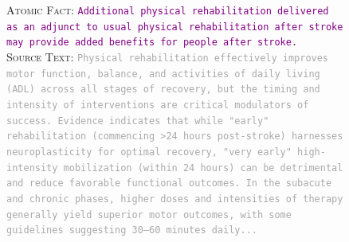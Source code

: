 \documentclass{article}
\begin{document}
\begin{figure}[h!]
\centering
\begin{small}
\begin{tcolorbox}[colback=gray!5, colframe=red, width=\textwidth]
\textsc{Atomic Fact:} \texttt{\textcolor{purple}{Additional physical rehabilitation delivered as an adjunct to usual physical rehabilitation after stroke may provide added benefits for people after stroke.}}\\
\textsc{Source Text:} \texttt{\footnotesize \textcolor{darkgray}{Physical rehabilitation effectively improves motor function, balance, and activities of daily living (ADL) across all stages of recovery, but the timing and intensity of interventions are critical modulators of success. Evidence indicates that while "early" rehabilitation (commencing >24 hours post-stroke) harnesses neuroplasticity for optimal recovery, "very early" high-intensity mobilization (within 24 hours) can be detrimental and reduce favorable functional outcomes. In the subacute and chronic phases, higher doses and intensities of therapy generally yield superior motor outcomes, with some guidelines suggesting 30–60 minutes daily...}}\\


\end{tcolorbox}
\end{small}
\end{figure}
\end{document}
